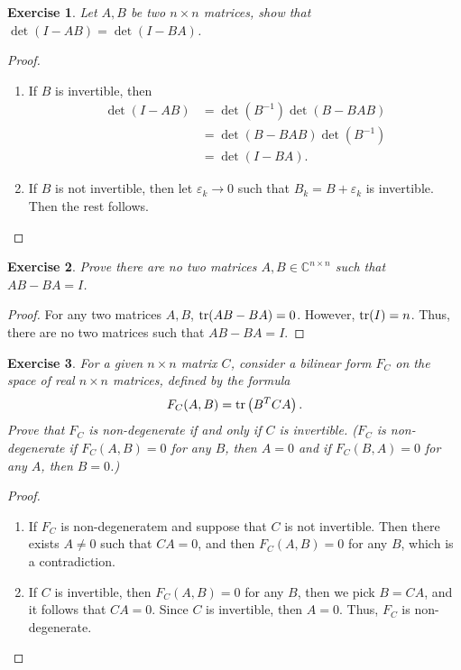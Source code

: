 \documentclass[11pt]{book}
\newtheorem{exercise}{Exercise}[section]
\theoremstyle{definition}
\numberwithin{equation}{chapter}
\begin{document}
\medskip

\begin{exercise}
Let $A, B$ be two $n \times n$ matrices, show that $\det (I - AB) = \det (I - BA)$.
\end{exercise}
\begin{proof}
~\begin{enumerate}[label=(\alph*)]
    \item If $B$ is invertible, then 
    \begin{align*}
        \det (I - AB) & = \det \left(B^{-1}\right) \det (B - BAB) \\
        & = \det (B - BAB) \det \left(B^{-1}\right) \\
        & = \det (I - BA).
    \end{align*}
    
    \item If $B$ is not invertible, then let $\varepsilon_k \to 0$ such that $B_k = B + \varepsilon_k$ is invertible. Then the rest follows.
\end{enumerate}
\end{proof}

\medskip

\begin{exercise}
Prove there are no two matrices $A, B \in \mathbb{C}^{n \times n}$ such that $AB - BA = I${\rm \cite{19}}. 
\end{exercise}
\begin{proof}
For any two matrices $A, B$, ${\rm tr}(AB - BA) = 0$\cite{20}. However, ${\rm tr} (I) = n$. Thus, there are no two matrices such that $AB - BA = I$.
\end{proof}

\medskip

\begin{exercise}{\bf *}
For a given $n \times n$ matrix $C$, consider a bilinear form $F_C$ on the space of real $n \times n$ matrices, defined by the formula 
\begin{align*}
    F_C(A, B) = {\rm tr} \left(B^T C A\right).
\end{align*}
Prove that $F_C$ is non-degenerate if and only if $C$ is invertible. ($F_C$ is non-degenerate if $F_C(A,B) = 0$ for any $B$, then $A = 0$ and if $F_C(B,A) = 0$ for any $A$, then $B = 0$.)
\end{exercise}
\begin{proof}
~\begin{enumerate}[label=(\alph*)]
    \item If $F_C$ is non-degeneratem and suppose that $C$ is not invertible. Then there exists $A \neq 0$ such that $CA = 0$, and then $F_C(A,B) = 0$ for any $B$, which is a contradiction.
    
    \item If $C$ is invertible, then $F_C(A, B) = 0$ for any $B$, then we pick $B = CA$, and it follows that $CA = 0$. Since $C$ is invertible, then $A = 0$. Thus, $F_C$ is non-degenerate.
\end{enumerate}
\end{proof}
\end{document}
